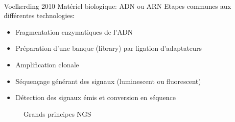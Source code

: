\documentclass[a4paper]{article}
\begin{document}
~~\\ 
Voelkerding 2010
Matériel biologique: ADN ou ARN
Etapes communes aux différentes technologies:
\begin{itemize}
\item Fragmentation enzymatiques de l'ADN
\item Préparation d'une banque (library) par ligation d'adaptateurs
\item Amplification clonale
\item Séquençage générant des signaux (luminescent ou fluorescent)
\item Détection des signaux émis et conversion en séquence
\end{itemize}

\begin{figure}[!h]
\caption{Grands principes NGS}
\end{figure}
\end{document}
